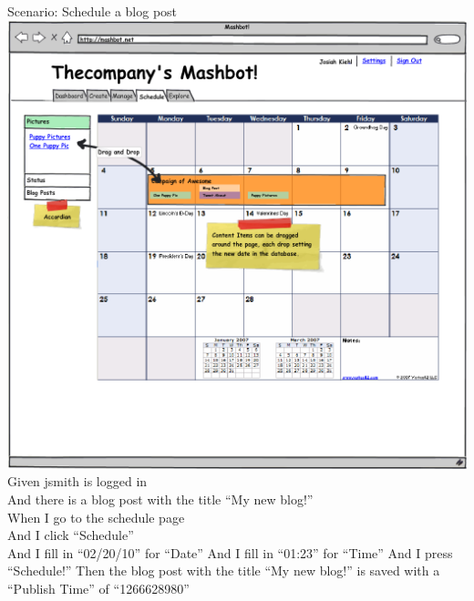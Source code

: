 \documentclass[12pt]{article}
\begin{document}
\begin{hangparas}{0.25in}{1}
  Scenario: Schedule a blog post \\
\includegraphics[width=\textwidth]{../mockups/schedule-content.png}
    Given jsmith is logged in \\
    And there is a blog post with the title ``My new blog!'' \\
    When I go to the schedule page \\
    And I click ``Schedule'' \\
    And I fill in ``02/20/10'' for ``Date''
    And I fill in ``01:23'' for ``Time''
    And I press ``Schedule!'' 
    Then the blog post with the title ``My new blog!'' is saved with a ``Publish Time'' of ``1266628980'' 
\end{hangparas}
\end{document}
